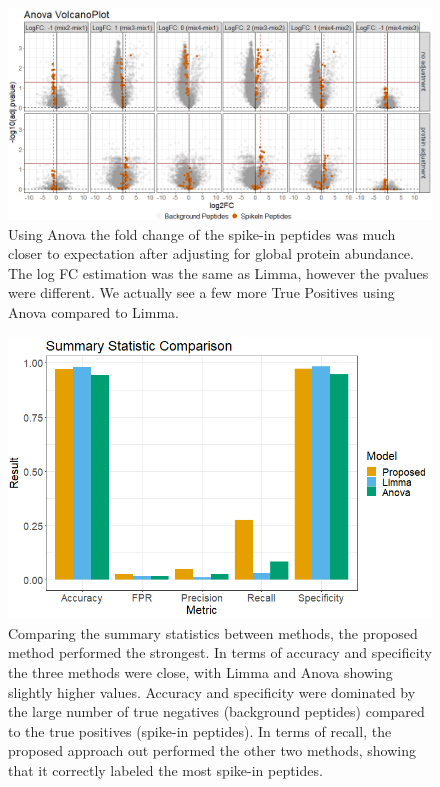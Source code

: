 \documentclass{mcp}
\begin{document}
\begin{figure}[h!]
\centering
\includegraphics[width=1\textwidth]{sim_new/spike_in_anova_volcano}
\caption{Using Anova the fold change of the spike-in peptides was much closer to expectation after adjusting for global protein abundance. The log FC estimation was the same as Limma, however the pvalues were different. We actually see a few more True Positives using Anova compared to Limma.\label{fig:spike_volcano_ttest}}
\end{figure}

\begin{figure}[h!]
\centering
\includegraphics[width=.85\textwidth]{sim_new/spike_in_statistic_comparison}
\caption{Comparing the summary statistics between methods, the proposed method performed the strongest. In terms of accuracy and specificity the three methods were close, with Limma and Anova showing slightly higher values. Accuracy and specificity were dominated by the large number of true negatives (background peptides) compared to the true positives (spike-in peptides). In terms of recall, the proposed approach out performed the other two methods, showing that it correctly labeled the most spike-in peptides. \label{fig:spike_stat}}
\end{figure}
\end{document}
